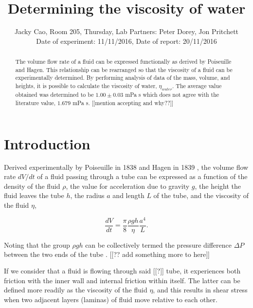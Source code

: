 \documentclass[twocolumn]{revtex4}
\begin{document}
\textheight=26.385cm

\title{Determining the viscosity of water} 
 
 
\author{Jacky Cao, Room 205, Thursday, Lab Partners: Peter Dorey, Jon Pritchett \\ Date of experiment: 11/11/2016, Date of report: 20/11/2016}


\begin{abstract}              
 
The volume flow rate of a fluid can be expressed functionally as derived by Poiseuille and Hagen. This relationship can be rearranged so that the viscosity of a fluid can be experimentally determined. By performing analysis of data of the mass, volume, and heights, it is possible to calculate the viscosity of water, $\eta_{water}$. The average value obtained was determined to be $1.00 \pm 0.03$ mPa s which does not agree with the literature value, $1.679$ mPa s. [[mention accepting and why??]]

\end{abstract}

\maketitle

\section{Introduction} 
\vspace{-2ex} 

Derived experimentally by Poiseuille in 1838 and Hagen in 1839 \cite{poiseuillehagen}, the volume flow rate $dV/dt$ of a fluid passing through a tube can be expressed as a function of the density of the fluid $\rho$, the value for acceleration due to gravity $g$, the height the fluid leaves the tube $h$, the radius $a$ and length $L$ of the tube, and the viscosity of the fluid $\eta$,

\begin{equation} 
\frac{dV}{dt}=\frac{\pi}{8}\frac{\rho gh}{\eta}\frac{a^4}{L}. 
\label{pohagen}
\end{equation}

Noting that the group $\rho gh$ can be collectively termed the pressure difference $\Delta P$ between the two ends of the tube \cite{collegephysics}. [[?? add something more to here]]

If we consider that a fluid is flowing through said [[?]] tube, it experiences both friction with the inner wall and internal friction within itself. The latter can be defined more readily as the viscosity of the fluid $\eta$, and this results in shear stress when two adjacent layers (laminas) of fluid move relative to each other. 
\end{document}

